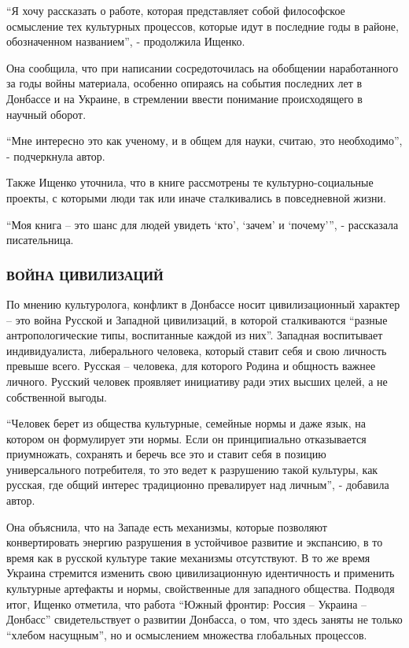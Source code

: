 \enquote{Я хочу рассказать о работе, которая представляет собой философское осмысление
тех культурных процессов, которые идут в последние годы в районе, обозначенном
названием}, - продолжила Ищенко.

Она сообщила, что при написании сосредоточилась на обобщении наработанного за
годы войны материала, особенно опираясь на события последних лет в Донбассе и
на Украине, в стремлении ввести понимание происходящего в научный оборот.

\enquote{Мне интересно это как ученому, и в общем для науки, считаю, это необходимо}, -
подчеркнула автор.

Также Ищенко уточнила, что в книге рассмотрены те культурно-социальные проекты,
с которыми люди так или иначе сталкивались в повседневной жизни.

\enquote{Моя книга – это шанс для людей увидеть \enquote{кто}, \enquote{зачем}
и \enquote{почему}}, - рассказала писательница.

\subsubsection{ВОЙНА ЦИВИЛИЗАЦИЙ}

По мнению культуролога, конфликт в Донбассе носит цивилизационный характер –
это война Русской и Западной цивилизаций, в которой сталкиваются \enquote{разные
антропологические типы, воспитанные каждой из них}. Западная воспитывает
индивидуалиста, либерального человека, который ставит себя и свою личность
превыше всего. Русская – человека, для которого Родина и общность важнее
личного. Русский человек проявляет инициативу ради этих высших целей, а не
собственной выгоды.

\enquote{Человек берет из общества культурные, семейные нормы и даже язык, на котором
он формулирует эти нормы. Если он принципиально отказывается приумножать,
сохранять и беречь все это и ставит себя в позицию универсального потребителя,
то это ведет к разрушению такой культуры, как русская, где общий интерес
традиционно превалирует над личным}, - добавила автор.

Она объяснила, что на Западе есть механизмы, которые позволяют конвертировать
энергию разрушения в устойчивое развитие и экспансию, в то время как в русской
культуре такие механизмы отсутствуют. В то же время Украина стремится изменить
свою цивилизационную идентичность и применить культурные артефакты и нормы,
свойственные для западного общества. Подводя итог, Ищенко отметила, что работа
\enquote{Южный фронтир: Россия – Украина – Донбасс} свидетельствует о развитии
Донбасса, о том, что здесь заняты не только \enquote{хлебом насущным}, но и
осмыслением множества глобальных процессов.

